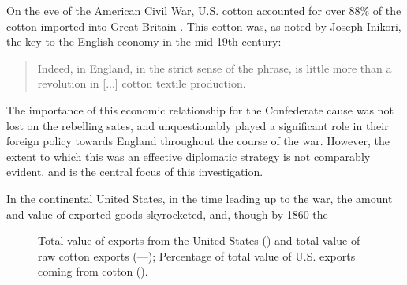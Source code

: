 
On the eve of the American Civil War, U.S. cotton accounted for over 88\% of the cotton imported into Great Britain \autocite[40]{baileyOtherSide1994}. This 
cotton was, as noted by Joseph Inikori, the key to the English economy in the mid-19th century: 
\begin{quote}
    Indeed,  in England, in the strict sense of the phrase, is little more than a revolution in [...] cotton textile production.
    \autocite[Joseph Inikori, {The Slave Trade and Revolution in Cotton Textile Production in England}, quoted in][40]{baileyOtherSide1994}
\end{quote}
The importance of this economic relationship for the Confederate cause was not lost on the rebelling sates, and unquestionably played a significant role in their 
foreign policy towards England throughout the course of the war. However, the extent to which this was an effective diplomatic strategy is not comparably evident,
and is the central focus of this investigation. 

In the continental United States, in the time leading up to the war, the amount and value of exported goods skyrocketed, and, though by 1860 the 

\begin{figure}[h]
    \centering
    
    \caption{
        Total value of exports from the United States\autocite[Table A-III]{northeconomicgrowth1966} (\textemdash) 
        and total value of raw cotton exports\autocite[Part 2, Table 2]{u.s.congressImportsduties1884} (---);
        Percentage of total value of U.S. exports coming from cotton (\textcolor{red!75!black}{\textemdash}).
    }
    \label{fig: 2.1}
\end{figure}